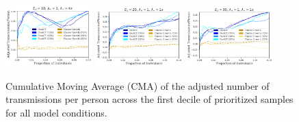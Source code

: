 \documentclass[a4paper,11pt]{article}
\begin{document}
\begin{figure}[!h]
\includegraphics[width=0.3\textwidth]{figs/results_efficacy_normalized_individual_SAMPLE-FIRSTART_STOPRATE-4x.pdf}
\includegraphics[width=0.3\textwidth]{figs/results_efficacy_normalized_individual_SAMPLE-FIRSTART_EXPDEGREE-20.pdf}
\includegraphics[width=0.3\textwidth]{figs/results_efficacy_normalized_individual_SAMPLE-FIRSTART_EXPDEGREE-30.pdf}\\
\caption{Cumulative Moving Average (CMA) of the adjusted number of transmissions per person across the first decile of prioritized samples for all model conditions.}\label{fig:cma-adj-trans-individual-all}
\end{figure}

\clearpage
\end{document}
